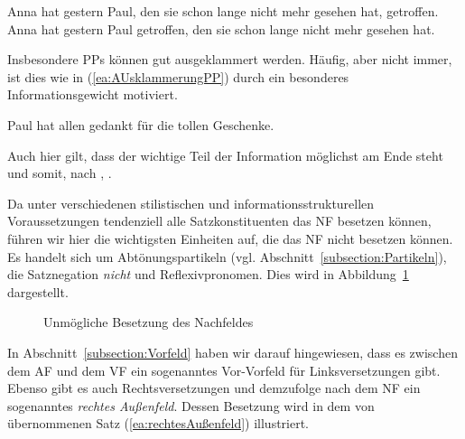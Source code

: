 \ea \label{ea:AuslagerungReklativsatz}
\ea \label{ea:RelMF} Anna hat gestern Paul, den sie schon lange nicht mehr gesehen hat, getroffen.
\ex \label{ex:RelNF} Anna hat gestern Paul getroffen, den sie schon lange nicht mehr gesehen hat.
\z 
\z 

Insbesondere PPs können gut ausgeklammert werden. Häufig, aber nicht immer, ist dies wie in (\ref{ea:AUsklammerungPP}) durch ein besonderes Informationsgewicht motiviert. 

\ea \label{ea:AUsklammerungPP} Paul hat allen gedankt für die tollen Geschenke.
\z

Auch hier gilt, dass der wichtige Teil der Information möglichst am Ende steht und somit, nach \citet[4]{Behaghel1932SyntaxStellung}, . 

Da unter verschiedenen stilistischen und informationsstrukturellen Voraussetzungen tendenziell alle Satzkonstituenten das NF besetzen können, führen wir hier die wichtigsten Einheiten auf, die das NF nicht besetzen können. Es handelt sich um Abtönungspartikeln (vgl. Abschnitt~\ref{subsection:Partikeln}), die Satznegation \textit{nicht} und Reflexivpronomen. Dies wird in Abbildung~\ref{fig:unmöglicheNachfeldbesetzung} dargestellt. 

\begin{figure}[!htbp]
  \centering
  \caption{Unmögliche Besetzung des Nachfeldes}
  \label{fig:unmöglicheNachfeldbesetzung}
\end{figure}

In Abschnitt~\ref{subsection:Vorfeld} haben wir darauf hingewiesen, dass es zwischen dem AF und dem VF ein sogenanntes Vor-Vorfeld für Linksversetzungen gibt. Ebenso gibt es auch Rechtsversetzungen und demzufolge nach dem NF ein sogenanntes \textit{rechtes Außenfeld}. Dessen Besetzung wird in dem von \citet[73]{Woellstein2014} übernommenen Satz (\ref{ea:rechtesAußenfeld}) illustriert.

